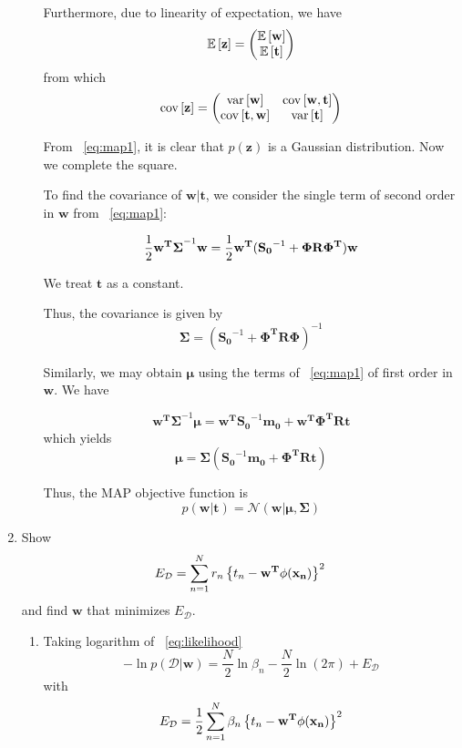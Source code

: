 \documentclass[reqno]{amsart}
\begin{document}
\begin{enumerate}[label=\textbf{(\Roman*)}]
\begin{enumerate}[label=\textbf{(\alph*)}]
                Furthermore, due to linearity of expectation, we have 
                \[\mathbb{E}\left[\mathbf{z}\right] = \begin{pmatrix}\mathbb{E}\left[\mathbf{w}\right] \\ \mathbb{E}\left[\mathbf{t}\right]\end{pmatrix}\]
                from which
                \[\text{cov}\left[\mathbf{z}\right] = \begin{pmatrix}
                    \text{var}\left[\mathbf{w}\right] & \text{cov}\left[\mathbf{w}, \mathbf{t}\right] \\
                    \text{cov}\left[\mathbf{t}, \mathbf{w}\right] & \text{var}\left[\mathbf{t}\right]
                \end{pmatrix}\]

                From ~\eqref{eq:map1}, it is clear that \(p(\mathbf{z})\) is a Gaussian distribution. Now we complete the square.
                
                To find the covariance of \(\mathbf{w|t}\), we consider the single term of second order in \(\mathbf{w}\) from ~\eqref{eq:map1}: 

                \[\frac{1}{2} \mathbf{w^T \Sigma}^{-1}\mathbf{w} = \frac{1}{2} \mathbf{w^T}(\mathbf{S_0}^{-1} + \mathbf{\Phi R \Phi^T})\mathbf{w} \]

                We treat \(\mathbf{t}\) as a constant.

                Thus, the covariance is given by \[\mathbf{\Sigma} = (\mathbf{S_0}^{-1} + \mathbf{\Phi^T R \Phi})^{-1}\]

                Similarly, we may obtain \(\boldsymbol{\mu}\) using the terms of ~\eqref{eq:map1} of first order in \(\mathbf{w}\). We have

                \[\mathbf{w^T \Sigma}^{-1} \boldsymbol{\mu} = \mathbf{w^T} \mathbf{S_0}^{-1} \mathbf{m_0} + \mathbf{w^T \Phi^T R t}\]
                    which yields
                \[\boldsymbol{\mu} = \boldsymbol{\Sigma} (\mathbf{S_0}^{-1} \mathbf{m_0} + \mathbf{\Phi^T R t})\]

                Thus, the MAP objective function is \[p(\mathbf{w|t}) = \mathcal{N} (\mathbf{w|\boldsymbol{\mu}, \Sigma})\]
                
        \end{enumerate}

        

        \item \question Show \[E_\mathcal{D} = \sum_{n = 1}^{N} r_n \left\{t_n - \mathbf{w^T \phi(x_n)}\right\}^2 \] and find \(\mathbf{w}\) that minimizes \(E_\mathcal{D}\).
        \solution
        \begin{enumerate}[label=\textbf{(\alph*)}]
            \item Taking logarithm of ~\eqref{eq:likelihood}
            \[-\ln p(\mathcal{D} | \mathbf{w}) = \frac{N}{2} \ln \beta_n - \frac{N}{2} \ln (2\pi) + E_\mathcal{D}\]
            with
            \begin{equation}
                E_\mathcal{D} = \frac{1}{2} \sum_{n = 1}^{N} \beta_n \left\{t_n - \mathbf{w^T \phi(x_n)}\right\}^2 \label{eq:ED}
            \end{equation}
    

\end{enumerate}
\end{enumerate}
\end{document}
